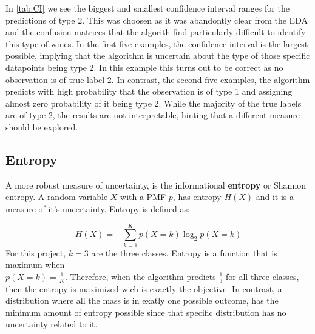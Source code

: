 \documentclass[11pt,twoside]{article}
\numberwithin{Theorem}{section}
\numberwithin{Definition}{section}
\numberwithin{Lemma}{section}
\numberwithin{Algorithm}{section}
\numberwithin{equation}{section}
\begin{document}
In \autoref{tab:CI} we see the biggest and smallest confidence interval ranges for the predictions of \textsf{type 2}. This was choosen as it was abandontly clear from the EDA and the confusion matrices that the algorith find particularly difficult to identify this type of wines. In the first five examples, the confidence interval is the largest possible, implying that the algorithm is uncertain about the type of those specific datapoints being \textsf{type 2}. In this example this turns out to be correct as no observation is of true label 2. In contrast, the second five examples, the algorithm predicts with high probability that the observation is of \textsf{type 1} and assigning almost zero probability of it being \textsf{type 2}. While the majority of the true labels are of \textsf{type 2}, the results are not interpretable, hinting that a different measure should be explored.

\subsection{Entropy}
A more robust measure of uncertainty, is the informational \textbf{entropy} or Shannon entropy. A random variable $X$ with a PMF $p$, has entropy $H(X)$ and it is a measure of it's uncertainty. Entropy is defined as:

\begin{equation}
H(X) = - \sum_{k=1}^K p(X=k) \log_2p(X=k)
\end{equation}
For this project, $k=3$ are the three classes. Entropy is a function that is maximum when \\
$p(X=k) = \frac{1}{K}$. Therefore, when the algorithm predicts $\frac{1}{3}$ for all three classes, then the entropy is maximized wich is exactly the objective. In contrast, a distribution where all the mass is in exatly one possible outcome, has the minimum amount of entropy possible since that specific distribution has no uncertainty related to it.
\end{document}
